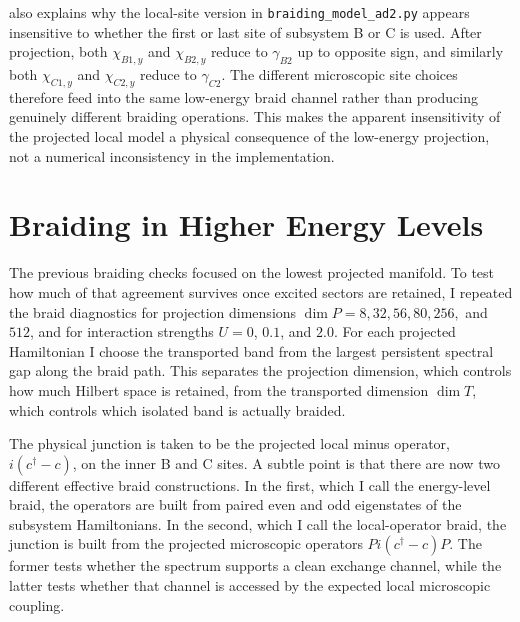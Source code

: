  also explains why the local-site version in \texttt{braiding\_model\_ad2.py} appears insensitive to whether the first or last site of subsystem B or C is used. After projection, both $\chi_{B1,y}$ and $\chi_{B2,y}$ reduce to $\gamma_{B2}$ up to opposite sign, and similarly both $\chi_{C1,y}$ and $\chi_{C2,y}$ reduce to $\gamma_{C2}$. The different microscopic site choices therefore feed into the same low-energy braid channel rather than producing genuinely different braiding operations. This makes the apparent insensitivity of the projected local model a physical consequence of the low-energy projection, not a numerical inconsistency in the implementation.

\section{Braiding in Higher Energy Levels}
The previous braiding checks focused on the lowest projected manifold. To test how much of that agreement survives once excited sectors are retained, I repeated the braid diagnostics for projection dimensions $\dim P = 8, 32, 56, 80, 256,$ and $512$, and for interaction strengths $U=0$, $0.1$, and $2.0$. For each projected Hamiltonian I choose the transported band from the largest persistent spectral gap along the braid path. This separates the projection dimension, which controls how much Hilbert space is retained, from the transported dimension $\dim T$, which controls which isolated band is actually braided.

The physical junction is taken to be the projected local minus operator, $i(c^\dagger-c)$, on the inner B and C sites. A subtle point is that there are now two different effective braid constructions. In the first, which I call the energy-level braid, the operators are built from paired even and odd eigenstates of the subsystem Hamiltonians. In the second, which I call the local-operator braid, the junction is built from the projected microscopic operators $P i(c^\dagger-c)P$. The former tests whether the spectrum supports a clean exchange channel, while the latter tests whether that channel is accessed by the expected local microscopic coupling.

\begin{table}[p]
  \centering
  \scriptsize
  \setlength{\tabcolsep}{4pt}
  \resizebox{\textwidth}{!}{}
  \caption{Target diagnostic for the corrected higher-energy braid scan with $\dim P=8,32,56,80,256,512$. All errors are normalized in the transported band. ``Phys.\ vs.\ $\gamma$ target'' compares the local-operator braid to $\exp(-\pi\gamma_2\gamma_3/4)$, where $\gamma_2$ and $\gamma_3$ are constructed from diagonal even-odd energy-level pairs. ``Phys.\ vs.\ $\Gamma^P$ target'' compares the same braid to $\exp(-\pi\Gamma_2^P\Gamma_3^P/4)$, where $\Gamma_2^P$ and $\Gamma_3^P$ are projected local Majorana operators. ``Target mismatch'' directly compares these two effective target gates.}
  \label{tab:retry2_target_diagnostic}
\end{table}

